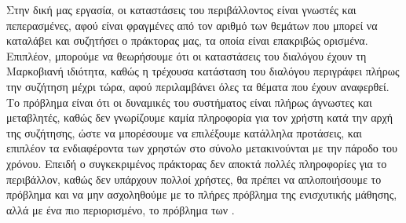 Στην δική μας εργασία, οι καταστάσεις του περιβάλλοντος είναι γνωστές και πεπερασμένες, αφού είναι φραγμένες από τον αριθμό των θεμάτων που μπορεί
να καταλάβει και συζητήσει ο πράκτορας μας, τα οποία είναι επακριβώς ορισμένα. Επιπλέον, μπορούμε να θεωρήσουμε ότι οι καταστάσεις του διαλόγου
έχουν τη Μαρκοβιανή ιδιότητα, καθώς η τρέχουσα κατάσταση του διαλόγου περιγράφει πλήρως την συζήτηση μέχρι τώρα, αφού περιλαμβάνει όλες τα θέματα που έχουν
αναφερθεί. Το πρόβλημα είναι ότι οι δυναμικές του
συστήματος είναι πλήρως άγνωστες και μεταβλητές, καθώς δεν γνωρίζουμε καμία πληροφορία για τον χρήστη κατά την αρχή της συζήτησης, ώστε να μπορέσουμε
να επιλέξουμε κατάλληλα προτάσεις, και επιπλέον τα ενδιαφέροντα των χρηστών στο σύνολο μετακινούνται με την πάροδο του χρόνου. Επειδή ο συγκεκριμένος
πράκτορας δεν αποκτά πολλές πληροφορίες για το περιβάλλον, καθώς δεν υπάρχουν πολλοί χρήστες, θα πρέπει να απλοποιήσουμε το πρόβλημα και να μην
ασχοληθούμε με το πλήρες πρόβλημα της ενισχυτικής μάθησης, αλλά με ένα πιο περιορισμένο, το πρόβλημα των .
